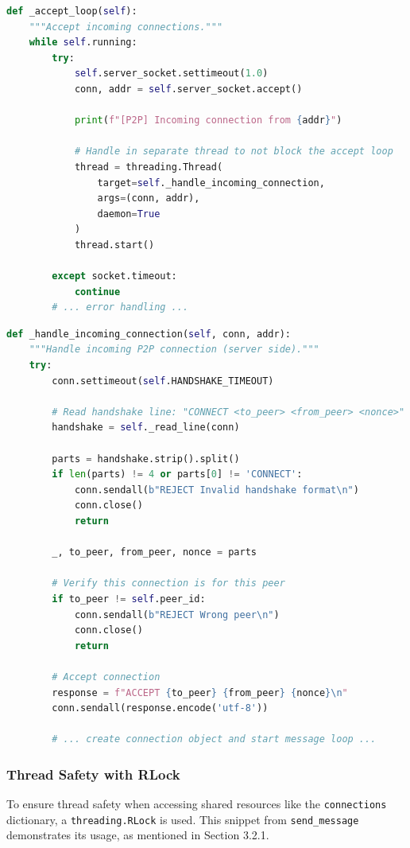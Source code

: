 \begin{lstlisting}[language=Python, caption={Accepting and Handling New Connections}, label={lst:accept_loop}]
def _accept_loop(self):
    """Accept incoming connections."""
    while self.running:
        try:
            self.server_socket.settimeout(1.0)
            conn, addr = self.server_socket.accept()
            
            print(f"[P2P] Incoming connection from {addr}")
            
            # Handle in separate thread to not block the accept loop
            thread = threading.Thread(
                target=self._handle_incoming_connection,
                args=(conn, addr),
                daemon=True
            )
            thread.start()
            
        except socket.timeout:
            continue
        # ... error handling ...
\end{lstlisting}

\begin{lstlisting}[language=Python, caption={Server-Side Handshake Protocol}, label={lst:handshake}]
def _handle_incoming_connection(self, conn, addr):
    """Handle incoming P2P connection (server side)."""
    try:
        conn.settimeout(self.HANDSHAKE_TIMEOUT)
        
        # Read handshake line: "CONNECT <to_peer> <from_peer> <nonce>"
        handshake = self._read_line(conn)
        
        parts = handshake.strip().split()
        if len(parts) != 4 or parts[0] != 'CONNECT':
            conn.sendall(b"REJECT Invalid handshake format\n")
            conn.close()
            return
        
        _, to_peer, from_peer, nonce = parts
        
        # Verify this connection is for this peer
        if to_peer != self.peer_id:
            conn.sendall(b"REJECT Wrong peer\n")
            conn.close()
            return
        
        # Accept connection
        response = f"ACCEPT {to_peer} {from_peer} {nonce}\n"
        conn.sendall(response.encode('utf-8'))
        
        # ... create connection object and start message loop ...
\end{lstlisting}

\subsubsection{Thread Safety with RLock}
\label{subsec:appendix_thread_safety}
To ensure thread safety when accessing shared resources like the \texttt{connections} dictionary, a \texttt{threading.RLock} is used. This snippet from \texttt{send\_message} demonstrates its usage, as mentioned in Section 3.2.1.

